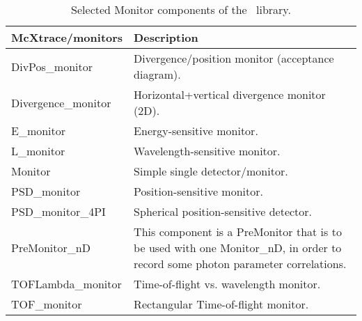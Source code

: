 \begin{table}
  \begin{center}
    {\let\my=\\
    \begin{tabular}{|p{}|p{}|}
      \hline
       {\bfseries McXtrace/monitors} & Description \\
       \hline
DivPos\_monitor  &    Divergence/position monitor (acceptance diagram). \\
Divergence\_monitor &  Horizontal+vertical
                    divergence monitor (2D). \\
E\_monitor       &    Energy-sensitive monitor. \\
L\_monitor        &  Wavelength-sensitive monitor. \\
Monitor          &   Simple single detector/monitor. \\
PSD\_monitor     &    Position-sensitive monitor. \\
PSD\_monitor\_4PI  &   Spherical position-sensitive detector. \\
PreMonitor\_nD    &   This component is a PreMonitor that is to be
                    used with one Monitor\_nD,
                    in order to record some photon parameter correlations. \\
TOFLambda\_monitor &  Time-of-flight vs. wavelength monitor. \\
TOF\_monitor     &    Rectangular Time-of-flight monitor. \\
      \hline
    \end{tabular}
    \caption{Selected Monitor components of the \MCX\ library.}
    \label{t:comp-monitors}
    }
  \end{center}
\end{table}

